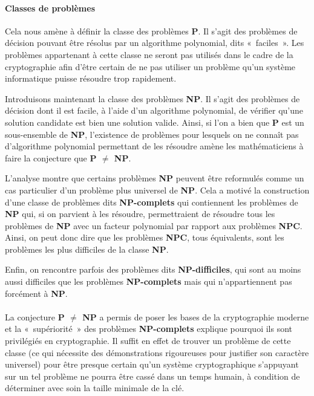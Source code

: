 \documentclass[a4paper,10pt]{article}
\begin{document}
\paragraph{Classes de problèmes} Cela nous amène à définir la classe des problèmes \textbf{P}. Il s'agit des problèmes de décision pouvant être résolus par un algorithme polynomial, dits «~faciles~». Les problèmes appartenant à cette classe ne seront pas utilisés dans le cadre de la cryptographie afin d'être certain de ne pas utiliser un problème qu'un système informatique puisse résoudre trop rapidement.

Introduisons maintenant la classe des problèmes \textbf{NP}. Il s'agit des problèmes de décision dont il est facile, à l'aide d'un algorithme polynomial, de vérifier qu'une solution candidate est bien une solution valide. Ainsi, si l'on a bien que \textbf{P} est un sous-ensemble de \textbf{NP}, l'existence de problèmes pour lesquels on ne connaît pas d'algorithme polynomial permettant de les résoudre amène les mathématiciens à faire la conjecture que \textbf{P $\ne$ NP}.

L'analyse montre que certains problèmes \textbf{NP} peuvent être reformulés comme un cas particulier d'un problème plus universel de \textbf{NP}. Cela a motivé la construction d'une classe de problèmes dits \textbf{NP-complets} qui contiennent les problèmes de \textbf{NP} qui, si on parvient à les résoudre, permettraient de résoudre tous les problèmes de \textbf{NP} avec un facteur polynomial par rapport aux problèmes \textbf{NPC}. Ainsi, on peut donc dire que les problèmes \textbf{NPC}, tous équivalents, sont les problèmes les plus difficiles de la classe \textbf{NP}.

Enfin, on rencontre parfois des problèmes dits \textbf{NP-difficiles}, qui sont au moins aussi difficiles que les problèmes \textbf{NP-complets} mais qui n'appartiennent pas forcément à \textbf{NP}.

\paragraph {} La conjecture \textbf{P $\ne$ NP} a permis de poser les bases de la cryptographie moderne et la «~supériorité~» des problèmes \textbf{NP-complets} explique pourquoi ils sont privilégiés en cryptographie. Il suffit en effet de trouver un problème de cette classe (ce qui nécessite des démonstrations rigoureuses pour justifier son caractère universel) pour être presque certain qu'un système cryptographique s'appuyant sur un tel problème ne pourra être cassé dans un temps humain, à condition de déterminer avec soin la taille minimale de la clé.
\end{document}
